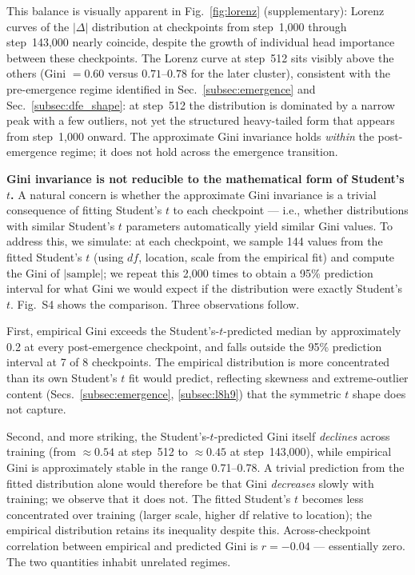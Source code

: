 \documentclass{article}
\begin{document}
This balance is visually apparent in Fig.~\ref{fig:lorenz} (supplementary): Lorenz curves of the $|\Delta|$ distribution at checkpoints from step~1,000 through step~143,000 nearly coincide, despite the growth of individual head importance between these checkpoints. The Lorenz curve at step~512 sits visibly above the others (Gini $= 0.60$ versus $0.71$--$0.78$ for the later cluster), consistent with the pre-emergence regime identified in Sec.~\ref{subsec:emergence} and Sec.~\ref{subsec:dfe_shape}: at step~512 the distribution is dominated by a narrow peak with a few outliers, not yet the structured heavy-tailed form that appears from step~1,000 onward. The approximate Gini invariance holds \emph{within} the post-emergence regime; it does not hold across the emergence transition.

\textbf{Gini invariance is not reducible to the mathematical form of Student's $t$.} A natural concern is whether the approximate Gini invariance is a trivial consequence of fitting Student's $t$ to each checkpoint --- i.e., whether distributions with similar Student's $t$ parameters automatically yield similar Gini values. To address this, we simulate: at each checkpoint, we sample 144 values from the fitted Student's $t$ (using $df$, location, scale from the empirical fit) and compute the Gini of $|\text{sample}|$; we repeat this 2,000 times to obtain a 95\% prediction interval for what Gini we would expect if the distribution were exactly Student's $t$. Fig.~S4 shows the comparison. Three observations follow.

First, empirical Gini exceeds the Student's-$t$-predicted median by approximately 0.2 at every post-emergence checkpoint, and falls outside the 95\% prediction interval at 7 of 8 checkpoints. The empirical distribution is more concentrated than its own Student's $t$ fit would predict, reflecting skewness and extreme-outlier content (Secs.~\ref{subsec:emergence}, \ref{subsec:l8h9}) that the symmetric $t$ shape does not capture.

Second, and more striking, the Student's-$t$-predicted Gini itself \emph{declines} across training (from $\approx 0.54$ at step~512 to $\approx 0.45$ at step~143,000), while empirical Gini is approximately stable in the range 0.71--0.78. A trivial prediction from the fitted distribution alone would therefore be that Gini \emph{decreases} slowly with training; we observe that it does not. The fitted Student's $t$ becomes less concentrated over training (larger scale, higher df relative to location); the empirical distribution retains its inequality despite this. Across-checkpoint correlation between empirical and predicted Gini is $r = -0.04$ --- essentially zero. The two quantities inhabit unrelated regimes.
\end{document}
